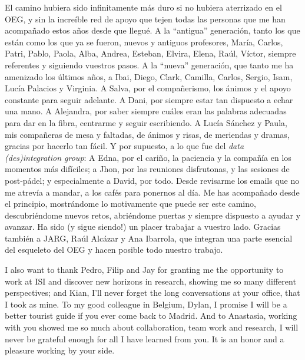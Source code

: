 El camino hubiera sido infinitamente más duro si no hubiera aterrizado en el OEG, y sin la increíble red de apoyo que tejen todas las personas que me han acompañado estos años desde que llegué. 
A la ``antigua'' generación, tanto los que están como los que ya se fueron, nuevos y antiguos profesores, María, Carlos, Patri, Pablo, Paola, Alba, Andrea, Esteban, Elvira, Elena, Raúl, Víctor, siempre referentes y siguiendo vuestros pasos. %
A la ``nueva'' generación, que tanto me ha amenizado los últimos años, a Ibai, Diego, Clark, Camilla, Carlos, Sergio, Isam, Lucía Palacios y Virginia. 
A Salva, por el compañerismo, los ánimos y el apoyo constante para seguir adelante.
A Dani, por siempre estar tan dispuesto a echar una mano.
A Alejandra, por saber siempre cuáles eran las palabras adecuadas para dar en la fibra, centrarme y seguir escribiendo.
A Lucía Sánchez y Paula, mis compañeras de mesa y faltadas, de ánimos y risas, de meriendas y dramas, gracias por hacerlo tan fácil. 
Y por supuesto, a lo que fue del \textit{data (des)integration group}: 
A Edna, por el cariño, la paciencia y la compañía en los momentos más difíciles; 
a Jhon, por las reuniones disfrutonas, y las sesiones de post-pádel;
y especialmente a David, por todo. Desde revisarme los emails que no me atrevía a mandar, a los cafés para ponernos al día. 
Me has acompañado desde el principio, mostrándome lo motivamente que puede ser este camino, descubriéndome nuevos retos, abriéndome puertas y siempre dispuesto a ayudar y avanzar. 
Ha sido (y sigue siendo!) un placer trabajar a vuestro lado.
Gracias también a JARG, Raúl Alcázar y Ana Ibarrola, que integran una parte esencial del esqueleto del OEG y hacen posible todo nuestro trabajo. 

I also want to thank Pedro, Filip and Jay for granting me the opportunity to work at ISI and discover new horizons in research, showing me so many different perspectives; and Kian, I'll never forget the long conversations at your office, that I took as mine. 
To my good colleague in Belgium, Dylan, I promise I will be a better tourist guide if you ever come back to Madrid. 
And to Anastasia, working with you showed me so much about collaboration, team work and research, I will never be grateful enough for all I have learned from you. It is an honor and a pleasure working by your side. 

